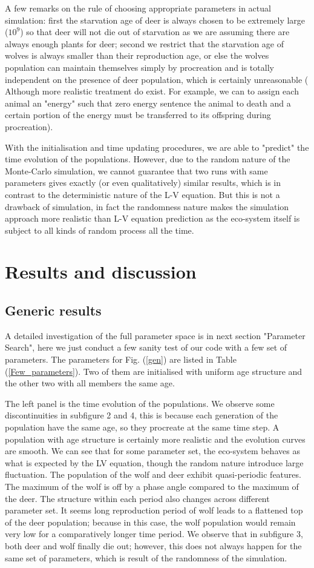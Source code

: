 \documentclass[a4paper,12pt]{article}
\begin{document}
A few remarks on the rule of choosing appropriate parameters in actual simulation: first the starvation age of deer is always chosen to be extremely large ($10^9$) so that deer will not die out of starvation as we are assuming there are always enough plants for deer; second we restrict that the starvation age of wolves is always smaller than their reproduction age, or else the wolves population can maintain themselves simply by procreation and is totally independent on the presence of deer population, which is certainly unreasonable ( Although more realistic treatment do exist. For example, we can to assign each animal an "energy" such that zero energy sentence the animal to death and a certain portion of the energy must be transferred to its offspring during procreation). 

With the initialisation and time updating procedures, we are able to "predict" the time evolution of the populations. However, due to the random nature of the Monte-Carlo simulation, we cannot guarantee that two runs with same parameters gives exactly (or even qualitatively) similar results, which is in contrast to the deterministic nature of the L-V equation. But this is not a drawback of simulation, in fact the randomness nature makes the simulation approach more realistic than L-V equation prediction as the eco-system itself is subject to all kinds of random process all the time.

\section{Results and discussion}
\subsection{Generic results}
A detailed investigation of the full parameter space is in next section "Parameter Search", here we just conduct a few sanity test of our code with a few set of parameters. The parameters for Fig. (\ref{gen}) are listed in Table (\ref{Few_parameters}). Two of them are initialised with uniform age structure and the other two with all members the same age. 

The left panel is the time evolution of the populations. We observe some discontinuities in subfigure 2 and 4, this is because each generation of the population have the same age, so they procreate at the same time step. A population with age structure is certainly more realistic and the evolution curves are smooth. We can see that for some parameter set, the eco-system behaves as what is expected by the LV equation, though the random nature introduce large fluctuation. The population of the wolf and deer exhibit quasi-periodic features. The maximum of the wolf is off by a phase angle compared to the maximum of the deer. The structure within each period also changes across different parameter set. It seems long reproduction period of wolf leads to a flattened top of the deer population; because in this case, the wolf population would remain very low for a comparatively longer time period. We observe that in subfigure 3, both deer and wolf finally die out; however, this does not always happen for the same set of parameters, which is result of the randomness of the simulation.
\end{document}
